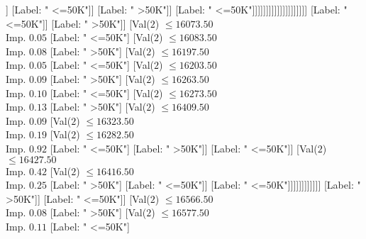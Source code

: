 \documentclass[margin=10pt]{standalone}
\begin{document}
\begin{forest}
																																																			[Label: " >50K"]]
																																																		[Label: " <=50K"]]
																																																	[Label: " >50K"]]
																																																[Label: " <=50K"]]]]]]]]]]]]]]]]]]]]
																													[Label: " <=50K"]]
																												[Label: " >50K"]]
																											[Val($2$) $ \leq 16073.50$ \\ Imp. $0.05$
																												[Label: " <=50K"]
																												[Val($2$) $ \leq 16083.50$ \\ Imp. $0.08$
																													[Label: " >50K"]
																													[Val($2$) $ \leq 16197.50$ \\ Imp. $0.05$
																														[Label: " <=50K"]
																														[Val($2$) $ \leq 16203.50$ \\ Imp. $0.09$
																															[Label: " >50K"]
																															[Val($2$) $ \leq 16263.50$ \\ Imp. $0.10$
																																[Label: " <=50K"]
																																[Val($2$) $ \leq 16273.50$ \\ Imp. $0.13$
																																	[Label: " >50K"]
																																	[Val($2$) $ \leq 16409.50$ \\ Imp. $0.09$
																																		[Val($2$) $ \leq 16323.50$ \\ Imp. $0.19$
																																			[Val($2$) $ \leq 16282.50$ \\ Imp. $0.92$
																																				[Label: " <=50K"]
																																				[Label: " >50K"]]
																																			[Label: " <=50K"]]
																																		[Val($2$) $ \leq 16427.50$ \\ Imp. $0.42$
																																			[Val($2$) $ \leq 16416.50$ \\ Imp. $0.25$
																																				[Label: " >50K"]
																																				[Label: " <=50K"]]
																																			[Label: " <=50K"]]]]]]]]]]]]
																								[Label: " >50K"]]
																							[Label: " <=50K"]]
																						[Val($2$) $ \leq 16566.50$ \\ Imp. $0.08$
																							[Label: " >50K"]
																							[Val($2$) $ \leq 16577.50$ \\ Imp. $0.11$
																								[Label: " <=50K"]

\end{forest}
\end{document}
